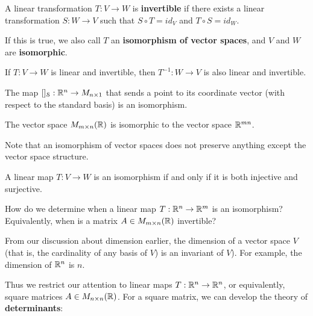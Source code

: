\begin{definition}
    A linear transformation $T: V \to W$ is \textbf{invertible} if there exists a linear transformation $S : W \to V$ such that $S \circ T = id_V$ and $T \circ S = id_W$.
    
    If this is true, we also call $T$ an \textbf{isomorphism of vector spaces}, and $V$ and $W$ are \textbf{isomorphic}.
    \end{definition}


\begin{proposition}
    If $T : V \to W$ is linear and invertible, then $T^{-1} : W \to V$ is also linear and invertible.
    \end{proposition}

\begin{example}
    The map $[]_\mathcal{S} : \mathbb{R}^n \to M_{n \times 1}$ that sends a point to its coordinate vector (with respect to the standard basis) is an isomorphism.
    \end{example}

\begin{example}
    The vector space $M_{m \times n}(\mathbb{R})$ is isomorphic to the vector space $\mathbb{R}^{mn}$.

    
    \end{example}

Note that an isomorphism of vector spaces does not preserve anything except the vector space structure.

\begin{proposition}
    A linear map $T : V \to W$ is an isomorphism if and only if it is both injective and surjective.
\end{proposition}






\begin{motivating}
How do we determine when a linear map $T : \mathbb{R}^n \to \mathbb{R}^m$ is an isomorphism?  Equivalently, when is a matrix $A \in M_{m \times n}(\mathbb{R})$ invertible?
\end{motivating}

From our discussion about dimension earlier,  the dimension of a vector space $V$ (that is, the cardinality of any basis of $V$) is an invariant of $V$).  For example, the dimension of $\mathbb{R}^n$ is $n$.  

Thus we restrict our attention to linear maps $T : \mathbb{R}^n \to \mathbb{R}^n$, or equivalently, square matrices $A \in M_{n \times n}(\mathbb{R})$.  For a square matrix, we can develop the theory of \textbf{determinants}:


